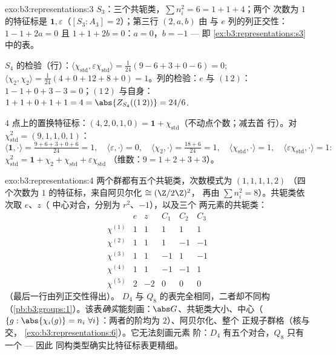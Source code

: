 \begin{solution}{exo:b3:representations:3}
$S_3$：三个共轭类，$\sum n_i^2 = 6 = 1 + 1 + 4$；两个
次数为 $1$ 的特征标是 $\mathbf 1, \varepsilon$（$[S_3 :
A_3] = 2$）；第三行 $(2, a, b)$ 由
与 $e$ 列的列正交性：$1 - 1 + 2a = 0$ 且 $1 + 1 +
2b = 0$：$a = 0$，$b = -1$ --- 即
\cref{ex:b3:representations:s3}中的表。

$S_4$ 的检验（行）：$\langle\chi_{\mathrm{std}},
\varepsilon\chi_{\mathrm{std}}\rangle = \frac1{24}(9 - 6 + 3 + 0
- 6) = 0$; $\langle\chi_2,\chi_2\rangle = \frac1{24}(4 + 0 + 12
+ 8 + 0) = 1$。列的检验：$e$ 与 $(1\,2)$：$1 - 1 + 0 + 3 - 3
= 0$；$(1\,2)$ 与自身：$1 + 1 + 0 + 1 + 1 = 4 =
\abs{Z_{S_4}((1\,2))} = 24/6$.

$4$ 点上的置换特征标：$(4, 2, 0, 1, 0) = \mathbf
1 + \chi_{\mathrm{std}}$（不动点个数；减去首
行）。对 $\chi_{\mathrm{std}}^2 = (9, 1, 1, 0, 1)$：
\[
\langle\mathbf1,\cdot\rangle = \tfrac{9 + 6 + 3 + 0 + 6}{24} =
1,\quad
\langle\varepsilon,\cdot\rangle = 0,\quad
\langle\chi_2,\cdot\rangle = \tfrac{18 + 6}{24} = 1,\quad
\langle\chi_{\mathrm{std}},\cdot\rangle = 1,\quad
\langle\varepsilon\chi_{\mathrm{std}},\cdot\rangle = 1:
\]
$\chi_{\mathrm{std}}^2 = \mathbf 1 + \chi_2 +
\chi_{\mathrm{std}} + \varepsilon\chi_{\mathrm{std}}$
（维数：$9 = 1 + 2 + 3 + 3$）。
\end{solution}

\begin{solution}{exo:b3:representations:4}
两个群都有五个共轭类，次数模式为 $(1,1,1,1,2)$
（四个次数为 $1$ 的特征标，来自阿贝尔化 $\cong (\Z/2\Z)^2$，
再由 $\sum n_i^2 = 8$）。共轭类依次取 $e$、$z$（
中心对合，分别为 $r^2$、$-1$），以及三个
两元素的共轭类：
\[
\begin{array}{c|ccccc}
& e & z & C_1 & C_2 & C_3\\
\hline
\chi^{(1)} & 1 & 1 & 1 & 1 & 1\\
\chi^{(2)} & 1 & 1 & 1 & -1 & -1\\
\chi^{(3)} & 1 & 1 & -1 & 1 & -1\\
\chi^{(4)} & 1 & 1 & -1 & -1 & 1\\
\chi^{(5)} & 2 & -2 & 0 & 0 & 0
\end{array}
\]
（最后一行由列正交性得出）。
$D_4$ 与 $Q_8$ 的表完全相同，二者却不同构
（\cref{pb:b3:groups:1}）。该表\emph{确实}能刻画：$\abs
G$、共轭类大小、中心（$\{g : \abs{\chi_i(g)} = n_i\
\forall i\}$：两者的阶均为 $2$）、阿贝尔化、整个
正规子群格（核与交，
\cref{exo:b3:representations:6}）。它无法刻画元素
阶：$D_4$ 有五个对合，$Q_8$ 只有一个 --- 因此
同构类型确实比特征标表更精细。
\end{solution}

